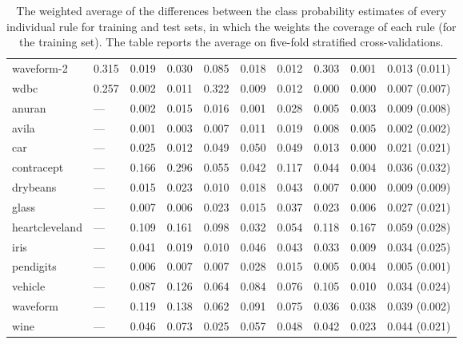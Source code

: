 \begin{table}[ht]
\begin{tabular}{l|llllllll|l}
  waveform-2 & 0.315 & 0.019 & 0.030 & 0.085 & 0.018 & 0.012 & 0.303 & 0.001 & 0.013 \tiny{(0.011)} \\ 
  wdbc & 0.257 & 0.002 & 0.011 & 0.322 & 0.009 & 0.012 & 0.000 & 0.000 & 0.007 \tiny{(0.007)} \\ 
  anuran & --- & 0.002 & 0.015 & 0.016 & 0.001 & 0.028 & 0.005 & 0.003 & 0.009 \tiny{(0.008)} \\ 
  avila & --- & 0.001 & 0.003 & 0.007 & 0.011 & 0.019 & 0.008 & 0.005 & 0.002 \tiny{(0.002)} \\ 
  car & --- & 0.025 & 0.012 & 0.049 & 0.050 & 0.049 & 0.013 & 0.000 & 0.021 \tiny{(0.021)} \\ 
  contracept & --- & 0.166 & 0.296 & 0.055 & 0.042 & 0.117 & 0.044 & 0.004 & 0.036 \tiny{(0.032)} \\ 
  drybeans & --- & 0.015 & 0.023 & 0.010 & 0.018 & 0.043 & 0.007 & 0.000 & 0.009 \tiny{(0.009)} \\ 
  glass & --- & 0.007 & 0.006 & 0.023 & 0.015 & 0.037 & 0.023 & 0.006 & 0.027 \tiny{(0.021)} \\ 
  heartcleveland & --- & 0.109 & 0.161 & 0.098 & 0.032 & 0.054 & 0.118 & 0.167 & 0.059 \tiny{(0.028)} \\ 
  iris & --- & 0.041 & 0.019 & 0.010 & 0.046 & 0.043 & 0.033 & 0.009 & 0.034 \tiny{(0.025)} \\ 
  pendigits & --- & 0.006 & 0.007 & 0.007 & 0.028 & 0.015 & 0.005 & 0.004 & 0.005 \tiny{(0.001)} \\ 
  vehicle & --- & 0.087 & 0.126 & 0.064 & 0.084 & 0.076 & 0.105 & 0.010 & 0.034 \tiny{(0.024)} \\ 
  waveform & --- & 0.119 & 0.138 & 0.062 & 0.091 & 0.075 & 0.036 & 0.038 & 0.039 \tiny{(0.002)} \\ 
  wine & --- & 0.046 & 0.073 & 0.025 & 0.057 & 0.048 & 0.042 & 0.023 & 0.044 \tiny{(0.021)} \\ 
   \hline\end{tabular}
\caption{The weighted average of the differences between the class probability estimates of every individual rule for training and test sets, in which the weights the coverage of each rule (for the training set). The table reports the average on five-fold stratified cross-validations.} \label{table:train_test_diff}
\end{table}